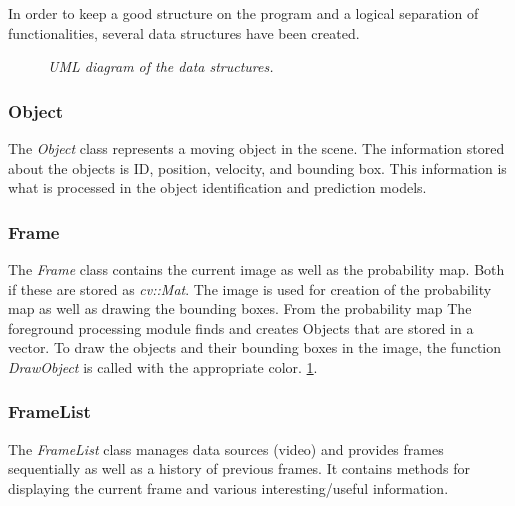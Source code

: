 In order to keep a good structure on the program and a logical separation of functionalities, several data structures have been created.

\begin{figure}[htb]
	\centering
	\caption{\textit{UML diagram of the data structures.}}
	\label{fig:UML_fig} %
\end{figure}


\subsubsection{Object}
The \emph{Object} class represents a moving object in the scene. The information stored about the objects is ID, position, velocity, and bounding box. This information is what is processed in the object identification and prediction models. 

\subsubsection{Frame}
The \emph{Frame} class contains the current image as well as the probability map. Both if these are stored as \emph{cv::Mat}. The image is used for creation of the probability map as well as drawing the bounding boxes. From the probability map The foreground processing module finds and creates Objects that are stored in a vector. To draw the objects and their bounding boxes in the image, the function \emph{DrawObject} is called with the appropriate color. \ref{fig:UML_fig}. %

\subsubsection{FrameList}
The \emph{FrameList} class manages data sources (video) and provides frames sequentially as well as a history of previous frames. It contains methods for displaying the current frame and various interesting/useful information.




